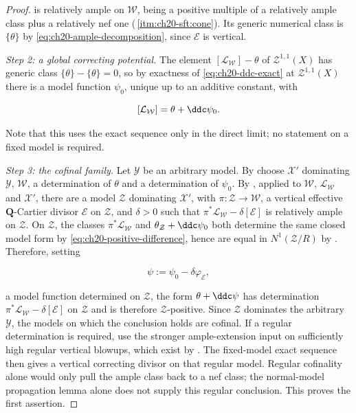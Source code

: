 \begin{proof}
is relatively ample on $\mathcal W$, being a positive multiple of a
relatively ample class plus a relatively nef one
(\,\cref{itm:ch20-sft:cone}).  Its generic
numerical class is $\{\theta\}$ by
\eqref{eq:ch20-ample-decomposition}, since $\mathcal E$ is vertical.

\emph{Step 2: a global correcting potential.}  The element
$[\mathcal L_{\mathcal W}]-\theta$ of $\mathcal Z^{1,1}(X)$ has generic
class $\{\theta\}-\{\theta\}=0$, so by exactness of
\eqref{eq:ch20-ddc-exact} at $\mathcal Z^{1,1}(X)$ there is a model
function $\psi_0$, unique up to an additive constant, with

\begin{equation}
\label{eq:ch20-positive-difference}
             [\mathcal L_{\mathcal W}]=\theta+\ddc\psi_0 .
\end{equation}

Note that this uses the exact sequence only in the direct limit; no
statement on a fixed model is required.

\emph{Step 3: the cofinal family.}  Let $\mathcal Y$ be an arbitrary
model.  By  choose $\mathcal X'$ dominating
$\mathcal Y$, $\mathcal W$, a determination of $\theta$ and a
determination of $\psi_0$.  By , applied
to $\mathcal W$, $\mathcal L_{\mathcal W}$ and $\mathcal X'$, there
are a model $\mathcal Z$ dominating $\mathcal X'$, with
$\pi:\mathcal Z\to\mathcal W$, a vertical effective
$\mathbf Q$-Cartier divisor $\mathcal E$ on $\mathcal Z$, and
$\delta>0$ such that
$\pi^*\mathcal L_{\mathcal W}-\delta[\mathcal E]$ is relatively ample on
$\mathcal Z$.  On $\mathcal Z$, the classes
$\pi^*\mathcal L_{\mathcal W}$ and $\theta_{\mathcal Z}+\ddc\psi_0$ both
determine the same closed model form by
\eqref{eq:ch20-positive-difference}, hence are equal in
$N^1(\mathcal Z/R)$ by .  Therefore, setting

\[
 \psi:=\psi_0-\delta\varphi_{\mathcal E},
\]

a model function determined on $\mathcal Z$, the form $\theta+\ddc\psi$
has determination $\pi^*\mathcal L_{\mathcal W}-\delta[\mathcal E]$ on
$\mathcal Z$ and is therefore $\mathcal Z$-positive.  Since
$\mathcal Z$ dominates the arbitrary $\mathcal Y$, the models on which
the conclusion holds are cofinal.  If a regular determination is required,
use the stronger ample-extension input
\cite[Corollary~1.5]{BFJ16} on sufficiently high regular vertical
blowups, which exist by .  The fixed-model exact
sequence then gives a vertical correcting divisor on that regular model.
Regular cofinality alone would only pull the ample class back to a nef
class; the normal-model propagation lemma alone does not supply this
regular conclusion.  This proves the first
assertion.


\end{proof}
